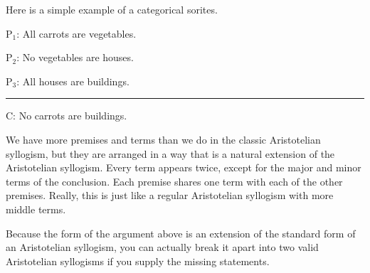 {Here is a simple example of a categorical sorites.

\begin{earg}
\item[P$_1$:] All carrots are vegetables.
\item[P$_2$:] No vegetables are houses. %
\item[P$_3$:] All houses are buildings. 	
\vspace{-.5em}
\item [] \rule{0.3\linewidth}{.5pt} 
\item[C:] No carrots are buildings. 
\end{earg}

We have more premises and terms than we do in the classic Aristotelian syllogism, but they are arranged in a way that is a natural extension of the Aristotelian syllogism. Every term appears twice, except for the major and minor terms of the conclusion. Each premise shares one term with each of the other premises. Really, this is just like a regular Aristotelian syllogism with more middle terms. 

Because the form of the argument above is an extension of the standard form of an Aristotelian syllogism, you can actually break it apart into two valid Aristotelian syllogisms if you supply the missing statements.


}
